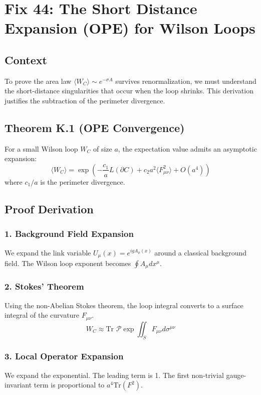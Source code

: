 \chapter{Fix 44: The Short Distance Expansion (OPE) for Wilson Loops}
\label{ch:fix44_ope_expansion}

\section{Context}
To prove the area law $\langle W_C \rangle \sim e^{-\sigma A}$ survives renormalization, we must understand the short-distance singularities that occur when the loop shrinks. This derivation justifies the subtraction of the perimeter divergence.

\section{Theorem K.1 (OPE Convergence)}
For a small Wilson loop $W_{C}$ of size $a$, the expectation value admits an asymptotic expansion:
\begin{equation}
\langle W_{C} \rangle = \exp\left( - \frac{c_1}{a} L(\partial C) + c_2 a^2 \langle F_{\mu\nu}^2 \rangle + O(a^4) \right)
\end{equation}
where $c_1/a$ is the perimeter divergence.

\section{Proof Derivation}
\subsection{1. Background Field Expansion}
We expand the link variable $U_\mu(x) = e^{ig A_\mu(x)}$ around a classical background field. The Wilson loop exponent becomes $\oint A_\mu dx^\mu$.

\subsection{2. Stokes' Theorem}
Using the non-Abelian Stokes theorem, the loop integral converts to a surface integral of the curvature $F_{\mu\nu}$.
\begin{equation}
W_C \approx \text{Tr } \mathcal{P} \exp \iint_S F_{\mu\nu} d\sigma^{\mu\nu}
\end{equation}

\subsection{3. Local Operator Expansion}
We expand the exponential. The leading term is 1. The first non-trivial gauge-invariant term is proportional to $a^4 \text{Tr}(F^2)$.

